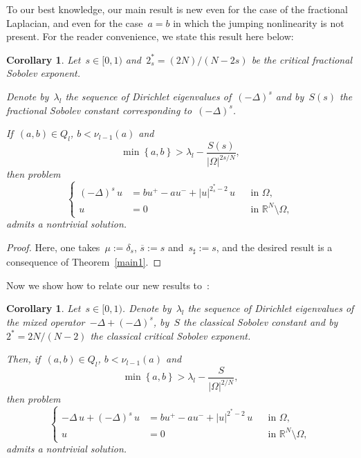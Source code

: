 \documentclass[12pt,a4paper,intlimits,sumlimits]{amsart}
\def \R {\mathbb{R}}
\newcommand{\set}[1]{\left\{#1\right\}}
\theoremstyle{definition}
\theoremstyle{plain}
\newtheorem{corollary}[definition]{Corollary}
\numberwithin{equation}{section}
\begin{document}
To our best knowledge, our main result is new even for the case of the fractional Laplacian, and even for the case~$a=b$ in which the jumping nonlinearity is not present. For the reader convenience, we state this result here below:

\begin{corollary}\label{ILFRA}
Let~$s\in [{{ 0 }}, 1)$  
and~$2^*_s = (2N)/(N-2s)$ be the critical fractional Sobolev exponent. 

Denote by~$\lambda_l$ the sequence of Dirichlet eigenvalues of~$(-\Delta)^s$ and by~$S(s)$ 
the fractional Sobolev constant corresponding to~$(-\Delta)^s$.

If~$(a, b)\in Q_l$, $b <\nu_{l-1}(a)$ and
\begin{equation*}
\min \set{a,b} > \lambda_l - \frac{S(s)}{|\Omega|^{2s/N}},
\end{equation*}
then problem 
\begin{equation*}
\left\{\begin{aligned}
(- \Delta)^s\, u & = bu^+ - au^- + |u|^{2_{s}^\ast - 2}\, u && \text{in } \Omega,\\
u & = 0 && \text{in } \R^N \setminus \Omega,
\end{aligned}\right.
\end{equation*}
admits a nontrivial solution.
\end{corollary}
\begin{proof}
Here, one takes~$\mu:= \delta_s$, $\overline s:=s$ and~$s_\sharp:=s$,
and the desired result is a consequence of Theorem~\ref{main1}.
\end{proof}

Now we show how to relate our new results to~\cite[Theorem 1.4]{arXiv.2209.07502}:

\begin{corollary}\label{mix_corollary}
Let~$s\in [{{ 0 }}, 1)$. 
Denote by~$\lambda_l$ the sequence of Dirichlet eigenvalues of the mixed operator~$-\Delta +(-\Delta)^s$, by~$S$ the classical Sobolev constant and
by~$2^* = 2N/(N-2)$ the classical critical Sobolev exponent. 

Then, if~$(a, b)\in Q_l$, $b <\nu_{l-1}(a)$ and
\begin{equation*}
\min \set{a,b} > \lambda_l -\frac{S}{|\Omega|^{2/N}},
\end{equation*}
then problem \begin{equation}\label{mixedab}
\left\{\begin{aligned}
-\Delta \, u + (-\Delta)^s \, u & = bu^+ - au^- + |u|^{2^* - 2}\, u && \text{in } \Omega,\\
u & = 0 && \text{in } \R^N \setminus \Omega,
\end{aligned}\right.
\end{equation}
admits a nontrivial solution.
\end{corollary}
\end{document}
